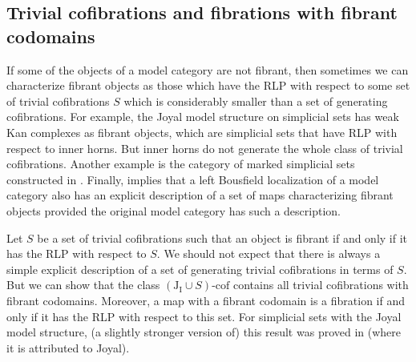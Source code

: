 \documentclass{tac}
\theoremstyle{definition}
\newcommand{\I}{\mathrm{I}}
\newcommand{\J}{\mathrm{J}}
\newcommand{\class}[2]{#1\text{-}\mathrm{#2}}
\newcommand{\Icof}[1][\I]{\class{#1}{cof}}
\begin{document}
\subsection{Trivial cofibrations and fibrations with fibrant codomains}

If some of the objects of a model category are not fibrant, then sometimes we can characterize fibrant objects as those which have
the RLP with respect to some set of trivial cofibrations $S$ which is considerably smaller than a set of generating cofibrations.
For example, the Joyal model structure on simplicial sets has weak Kan complexes as fibrant objects,
which are simplicial sets that have RLP with respect to inner horns.
But inner horns do not generate the whole class of trivial cofibrations.
Another example is the category of marked simplicial sets constructed in \cite[Proposition~3.1.3.7]{lurie-topos}.
Finally, \cite[Lemma~3.3.11]{hirschhorn} implies that a left Bousfield localization of a model category
also has an explicit description of a set of maps characterizing fibrant objects provided the original model category has such a description.

Let $S$ be a set of trivial cofibrations such that an object is fibrant if and only if it has the RLP with respect to $S$.
We should not expect that there is always a simple explicit description of a set of generating trivial cofibrations in terms of $S$.
But we can show that the class $\Icof[(\J_\I \cup S)]$ contains all trivial cofibrations with fibrant codomains.
Moreover, a map with a fibrant codomain is a fibration if and only if it has the RLP with respect to this set.
For simplicial sets with the Joyal model structure, (a slightly stronger version of) this result was proved in \cite[Corollary~2.4.6.5]{lurie-topos} (where it is attributed to Joyal).
\end{document}
